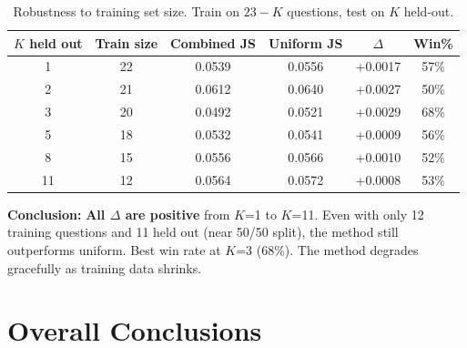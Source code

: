 \documentclass[10pt,a4paper]{article}
\begin{document}
\begin{table}[h]
\centering\small
\caption{Robustness to training set size. Train on $23-K$ questions, test on $K$ held-out.}
\begin{tabular}{@{}cccccc@{}}
\toprule
$K$ held out & Train size & Combined JS & Uniform JS & $\Delta$ & Win\% \\
\midrule
1 & 22 & 0.0539 & 0.0556 & +0.0017 & 57\% \\
2 & 21 & 0.0612 & 0.0640 & +0.0027 & 50\% \\
\rowcolor{best} 3 & 20 & 0.0492 & 0.0521 & +0.0029 & 68\% \\
5 & 18 & 0.0532 & 0.0541 & +0.0009 & 56\% \\
8 & 15 & 0.0556 & 0.0566 & +0.0010 & 52\% \\
11 & 12 & 0.0564 & 0.0572 & +0.0008 & 53\% \\
\bottomrule
\end{tabular}
\end{table}

\textbf{Conclusion:} \textbf{All $\Delta$ are positive} from $K$=1 to $K$=11. Even with only 12 training questions and 11 held out (near 50/50 split), the method still outperforms uniform. Best win rate at $K$=3 (68\%). The method degrades gracefully as training data shrinks.

\section{Overall Conclusions}
\end{document}
